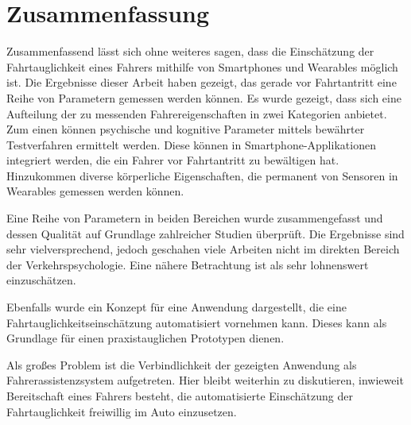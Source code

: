 \section{Zusammenfassung}
\label{conclusion}
Zusammenfassend lässt sich ohne weiteres sagen, dass die Einschätzung der Fahrtauglichkeit eines Fahrers mithilfe von Smartphones und Wearables möglich ist. Die Ergebnisse dieser Arbeit haben gezeigt, das gerade vor Fahrtantritt eine Reihe von Parametern gemessen werden können. Es wurde gezeigt, dass sich eine Aufteilung der zu messenden Fahrereigenschaften in zwei Kategorien anbietet. Zum einen können psychische und kognitive Parameter mittels bewährter Testverfahren ermittelt werden. Diese können in Smartphone-Applikationen integriert werden, die ein Fahrer vor Fahrtantritt zu bewältigen hat. Hinzukommen diverse körperliche Eigenschaften, die permanent von Sensoren in Wearables gemessen werden können.

Eine Reihe von Parametern in beiden Bereichen wurde zusammengefasst und dessen Qualität auf Grundlage zahlreicher Studien überprüft. Die Ergebnisse sind sehr vielversprechend, jedoch geschahen viele Arbeiten nicht im direkten Bereich der Verkehrspsychologie. Eine nähere Betrachtung ist als sehr lohnenswert einzuschätzen.

Ebenfalls wurde ein Konzept für eine Anwendung dargestellt, die eine Fahrtauglichkeitseinschätzung automatisiert vornehmen kann. Dieses kann als Grundlage für einen praxistauglichen Prototypen dienen.

Als großes Problem ist die Verbindlichkeit der gezeigten Anwendung als Fahrerassistenzsystem aufgetreten. Hier bleibt weiterhin zu diskutieren, inwieweit Bereitschaft eines Fahrers besteht, die automatisierte Einschätzung der Fahrtauglichkeit freiwillig im Auto einzusetzen.